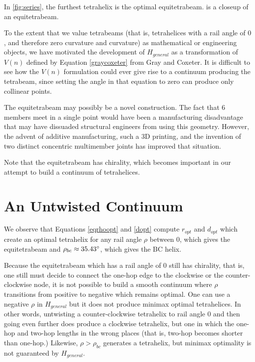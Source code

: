 \documentclass[review]{siamonline1116}
\begin{document}
In \cref{fig:series}, the furthest tetrahelix is the optimal equitetrabeam.
 is a closeup of an equitetrabeam.

To the extent that we value tetrabeams (that is, tetrahelices with a rail angle of $0$,
and therefore zero curvature and curvature) as mathematical or engineering objects,
we have motivated the development of $H_{general}$ as a transformation of $V(n)$ defined by
Equation \eqref{graycoxeter} from Gray and Coxeter. It is difficult to see how
the $V(n)$ 
formulation could ever give rise to a continuum producing the tetrabeam,
since setting the angle in that equation to zero can produce only collinear points.

The equitetrabeam may possibly be a novel construction.
The fact that 6 members meet in a single point would have been a manufacturing disadvantage that
may have dissuaded structural engineers from using this geometry.
However, the advent of additive manufacturing, such a 3D printing, and the invention of two
distinct concentric multimember joints\cite{song2003spherical,HamlinSandersonCMS} has improved that situation.

Note that the equitetrabeam has chirality, which becomes important in our attempt to build a
continuum of tetrahelices.

\section{An Untwisted Continuum}
\label{sec:continuum}


We observe that Equations \eqref{eqrhoopt} and \eqref{dopt} compute $r_{opt}$ and $d_{opt}$ which
create an optimal tetrahelix for any rail angle $\rho$ between $0$, which
gives the equitetrabeam and
$\rho_{bc} \approx 35.43 \degree$, which gives the BC helix.

 Because the equitetrabeam which has a rail angle of $0$ still has
 chirality, that is, one still must decide to connect the one-hop edge to
 the clockwise or the counter-clockwise node, it is not possible to build
 a smooth continuum where $\rho$ transitions from positive to negative
 which remains optimal. One can use a negative $\rho$ in $H_{general}$
 but it does not produce minimax optimal tetrahelices. In other words,
 untwisting a counter-clockwise tetrahelix to rail angle $0$ and then going
even further does produce a clockwise tetrahelix, but one in which the
 one-hop and two-hop lengths in the wrong places (that is, two-hop
 becomes shorter than one-hop.) Likewise, $\rho > \rho_{bc}$ generates
 a tetrahelix, but minimax optimality is not guaranteed by $H_{general}$.
 
\end{document}
